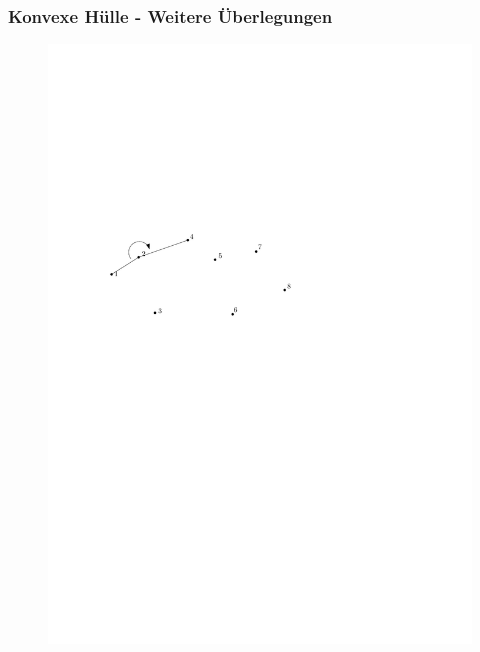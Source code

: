 \begin{frame}
	\frametitle{{Konvexe Hülle - Weitere Überlegungen}}
\begin{figure}[htbp]
	\begin{center}
  	\includegraphics[width=.8\linewidth]{bilder/graham4}
	\end{center}
\end{figure}
\end{frame}


